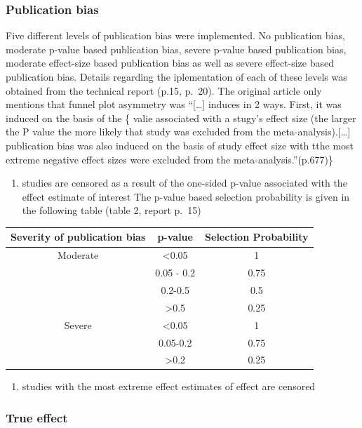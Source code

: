 \documentclass[
  english,
  doc,floatsintext,draftall]{apa6}
\providecommand{\tightlist}{%
  \setlength{\itemsep}{0pt}\setlength{\parskip}{0pt}}
\begin{document}
\hypertarget{publication-bias}{%
\subsubsection{Publication bias}\label{publication-bias}}

Five different levels of publication bias were implemented. No publication bias, moderate p-value based publication bias, severe p-value based publication bias, moderate effect-size based publication bias as well as severe effect-size based publication bias.
Details regarding the iplementation of each of these levels was obtained from the technical report (p.15, p.~20). The original article only mentions that funnel plot asymmetry was \enquote{{[}\ldots{]} induces in 2 ways. First, it was induced on the basis of the \{ valie associated with a stugy's effect size (the larger the P value the more likely that study was excluded from the meta-analysis).{[}\ldots{]} publication bias was also induced on the basis of study effect size with tthe most extreme negative effect sizes were excluded from the meta-analysis.}(p.677)\}

\begin{enumerate}
\def\labelenumi{\arabic{enumi}.}
\tightlist
\item
  studies are censored as a result of the one-sided p-value associated with the effect estimate of interest
  The p-value based selection probability is given in the following table (table 2, report p.~15)
\end{enumerate}

\begin{longtable}[]{@{}ccc@{}}
\toprule
Severity of publication bias & p-value & Selection Probability\tabularnewline
\midrule
\endhead
Moderate & \textless0.05 & 1\tabularnewline
& 0.05 - 0.2 & 0.75\tabularnewline
& 0.2-0.5 & 0.5\tabularnewline
& \textgreater0.5 & 0.25\tabularnewline
Severe & \textless0.05 & 1\tabularnewline
& 0.05-0.2 & 0.75\tabularnewline
& \textgreater0.2 & 0.25\tabularnewline
\bottomrule
\end{longtable}

\begin{enumerate}
\def\labelenumi{\arabic{enumi}.}
\setcounter{enumi}{1}
\tightlist
\item
  studies with the most extreme effect estimates of effect are censored
\end{enumerate}

\hypertarget{true-effect}{%
\subsubsection{True effect}\label{true-effect}}
\end{document}
